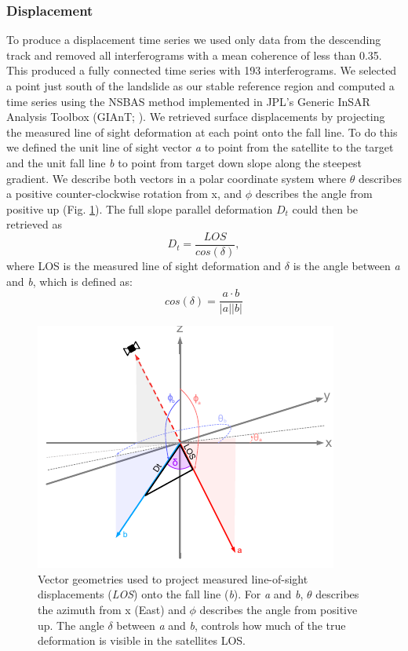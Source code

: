\documentclass[journal abbreviation, manuscript]{copernicus}
\begin{document}
 \subsubsection{Displacement}
To produce a displacement time series we used only data from the descending track and removed all interferograms with a mean coherence of less than 0.35. This produced a fully connected time series with 193 interferograms. We selected a point just south of the landslide as our stable reference region and computed a time series using the NSBAS method implemented in JPL's Generic InSAR Analysis Toolbox (GIAnT; \cite{agram2013}). We retrieved surface displacements by projecting the measured line of sight deformation at each point onto the fall line. To do this we defined the unit line of sight vector \textit{a} to point from the satellite to the target and the unit fall line \textit{b} to point from target down slope along the steepest gradient. We describe both vectors in a polar coordinate system where $\theta$ describes a positive counter-clockwise rotation from x, and $\phi$ describes the angle from positive up (Fig. \ref{fig:los}). The full slope parallel deformation $D_t$ could then be retrieved as
\begin{equation}
    D_t = \frac{LOS}{cos(\delta)}, 
\end{equation}
where LOS is the measured line of sight deformation and $\delta$ is the angle between \textit{a} and \textit{b}, which is defined as:
\begin{equation}
    cos(\delta) = \frac{a \cdot b}{\rvert a \rvert \rvert b \rvert}
\end{equation}
  
\begin{figure}[hbt!]
    \centering
    \includegraphics[scale = 1.5]{los_projections.pdf}
    \caption{Vector geometries used to project measured line-of-sight displacements (\textit{LOS}) onto the fall line (\textit{b}). For \textit{a} and \textit{b}, $\theta$ describes the azimuth from x (East) and $\phi$ describes the angle from positive up. The angle $\delta$ between \textit{a} and \textit{b}, controls how much of the true deformation is visible in the satellites LOS.}
    \label{fig:los}
\end{figure}  
\end{document}
